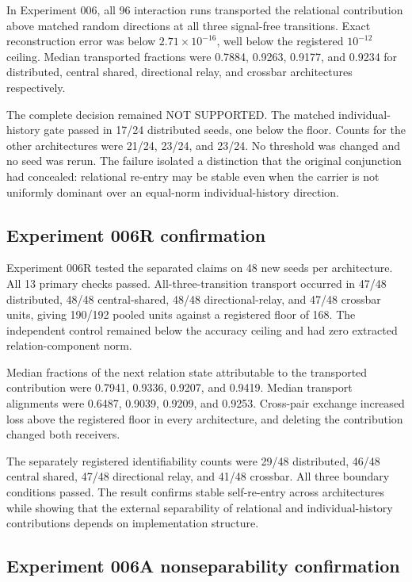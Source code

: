 \documentclass[11pt,a4paper]{article}
\newcommand{\statusnotsupported}{\textsf{NOT SUPPORTED}}
\begin{document}
In Experiment 006, all 96 interaction runs transported the relational contribution above matched random directions at all three signal-free transitions. Exact reconstruction error was below $2.71\times10^{-16}$, well below the registered $10^{-12}$ ceiling. Median transported fractions were 0.7884, 0.9263, 0.9177, and 0.9234 for distributed, central shared, directional relay, and crossbar architectures respectively.

The complete decision remained \statusnotsupported. The matched individual-history gate passed in 17/24 distributed seeds, one below the floor. Counts for the other architectures were 21/24, 23/24, and 23/24. No threshold was changed and no seed was rerun. The failure isolated a distinction that the original conjunction had concealed: relational re-entry may be stable even when the carrier is not uniformly dominant over an equal-norm individual-history direction.

\subsection{Experiment 006R confirmation}

Experiment 006R tested the separated claims on 48 new seeds per architecture. All 13 primary checks passed. All-three-transition transport occurred in 47/48 distributed, 48/48 central-shared, 48/48 directional-relay, and 47/48 crossbar units, giving 190/192 pooled units against a registered floor of 168. The independent control remained below the accuracy ceiling and had zero extracted relation-component norm.

Median fractions of the next relation state attributable to the transported contribution were 0.7941, 0.9336, 0.9207, and 0.9419. Median transport alignments were 0.6487, 0.9039, 0.9209, and 0.9253. Cross-pair exchange increased loss above the registered floor in every architecture, and deleting the contribution changed both receivers.

The separately registered identifiability counts were 29/48 distributed, 46/48 central shared, 47/48 directional relay, and 41/48 crossbar. All three boundary conditions passed. The result confirms stable self-re-entry across architectures while showing that the external separability of relational and individual-history contributions depends on implementation structure.

\subsection{Experiment 006A nonseparability confirmation}
\end{document}
